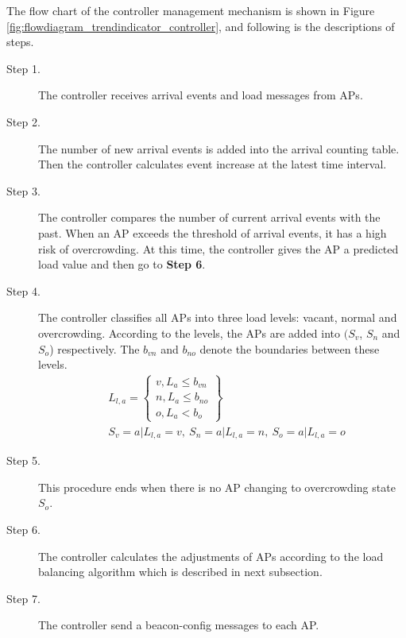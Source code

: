 The flow chart of the controller management mechanism is shown in Figure \ref{fig:flowdiagram_trendindicator_controller}, and following is the descriptions of steps.
\begin{description}
  \item [Step 1.] The controller receives arrival events and load messages from APs.
  \item [Step 2.] The number of new arrival events is added into the arrival counting table. Then the controller calculates event increase at the latest time interval.
  \item [Step 3.] The controller compares the number of current arrival events with the past. When an AP exceeds the threshold of arrival events, it has a high risk of overcrowding. At this time, the controller gives the AP a predicted load value and then go to \textbf{Step 6}.
  \item [Step 4.] The controller classifies all APs into three load levels: vacant, normal and overcrowding. According to the levels, the APs are added into $({S_v}$, ${S_n}$ and ${S_o}$) respectively. The $b_{vn}$ and $b_{no}$ denote the boundaries between these levels.
      \begin{align}
        &L_{l,a}=\left\{\begin{array}{lll}
            v, L_a \leq b_{vn} \\ n, L_a \leq b_{no} \\ o, L_a < b_o
            \end{array} \right\} \\
            \nonumber
        &S_v={a|L_{l,a}=v},\ 
        S_n={a|L_{l,a}=n},\ 
        S_o={a|L_{l,a}=o}
      \end{align}
  \item [Step 5.] This procedure ends when there is no AP changing to overcrowding state $S_o$.
  \item [Step 6.] The controller calculates the adjustments of APs according to the load balancing algorithm which is described in next subsection.
  \item [Step 7.] The controller send a beacon-config messages to each AP.
\end{description}

